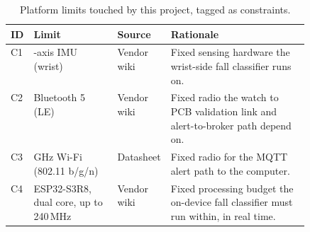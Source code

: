 \begin{table}[!ht]
\centering
\small
\caption{Platform limits touched by this project, tagged as constraints.}
\label{tab:platform}
\begin{tabularx}{\linewidth}{
  @{}>{\raggedright\arraybackslash}p{0.06\linewidth}
    >{\raggedright\arraybackslash}p{0.28\linewidth}
    >{\raggedright\arraybackslash}p{0.15\linewidth}
    >{\raggedright\arraybackslash}X@{}}
\toprule
ID & Limit & Source & Rationale \\
\midrule
C1 & 6-axis IMU (wrist) & Vendor wiki & Fixed sensing hardware the wrist-side fall classifier runs on. \\
\addlinespace
C2 & Bluetooth 5 (LE) & Vendor wiki & Fixed radio the watch to PCB validation link and alert-to-broker path depend on. \\
\addlinespace
C3 & 2.4 GHz Wi-Fi (802.11 b/g/n) & Datasheet & Fixed radio for the MQTT alert path to the computer. \\
\addlinespace
C4 & ESP32-S3R8, dual core, up to 240\,MHz & Vendor wiki & Fixed processing budget the on-device fall classifier must run within, in real time. \\
\bottomrule
\end{tabularx}
\end{table}